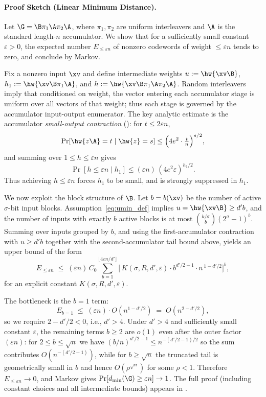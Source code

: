 \paragraph{Proof Sketch (Linear Minimum Distance).}
Let $\G=\B\pi_1\A\pi_2\A$, where $\pi_1,\pi_2$ are uniform interleavers and $\A$
is the standard length-$n$ accumulator. We show that for a sufficiently small
constant $\varepsilon>0$, the expected number $E_{\le \varepsilon n}$ of nonzero
codewords of weight $\le \varepsilon n$ tends to zero, and conclude by Markov.

Fix a nonzero input $\xv$ and define intermediate weights
$u:=\hw{\xv\B}$, $h_1:=\hw{\xv\B\pi_1\A}$, and $h:=\hw{\xv\B\pi_1\A\pi_2\A}$.
Random interleavers imply that conditioned on weight, the vector entering each
accumulator stage is uniform over all vectors of that weight; thus each stage is
governed by the accumulator input-output enumerator.
The key analytic estimate is the accumulator \emph{small-output contraction}
(): for $t\le 2\varepsilon n$,
\[
\Pr[\hw{z\A}=t\mid \hw{z}=s]\le \Big(4e^2\cdot\tfrac{t}{n}\Big)^{s/2},
\]
and summing over $1\le h\le \varepsilon n$ gives
\[
\Pr[h\le \varepsilon n\mid h_1]\le (\varepsilon n)\,(4e^2\varepsilon)^{h_1/2}.
\]
Thus achieving $h\le \varepsilon n$ forces $h_1$ to be small, and is strongly
suppressed in $h_1$.

We now exploit the block structure of $\B$. Let $b=b(\xv)$ be the number of
active $\sigma$-bit input blocks. Assumption~\eqref{eq:umin_def} implies
$u=\hw{\xv\B}\ge d'b$, and the number of inputs with exactly $b$ active blocks is
at most $\binom{k/\sigma}{b}(2^\sigma-1)^b$. Summing over inputs grouped by $b$,
and using the first-accumulator contraction with $u\ge d'b$ together with the
second-accumulator tail bound above, yields an upper bound of the form
\[
E_{\le \varepsilon n}
\;\le\;
(\varepsilon n)\,C_0
\sum_{b=1}^{\lfloor 4\varepsilon n/d'\rfloor}
\Big[\,K(\sigma,R,d',\varepsilon)\cdot b^{d'/2-1}\cdot n^{\,1-d'/2}\Big]^b,
\]
for an explicit constant $K(\sigma,R,d',\varepsilon)$.

The bottleneck is the $b=1$ term:
\[
E_{b=1}\;\le\;(\varepsilon n)\cdot O(n^{1-d'/2}) \;=\; O(n^{2-d'/2}),
\]
so we require $2-d'/2<0$, i.e., $d'>4$. Under $d'>4$ and sufficiently small
constant $\varepsilon$, the remaining terms $b\ge 2$ are $o(1)$ even after the
outer factor $(\varepsilon n)$: for $2\le b\le \sqrt{n}$ we have
$(b/n)^{d'/2-1}\le n^{-(d'/2-1)/2}$ so the sum contributes $O(n^{-(d'/2-1)})$,
while for $b\ge \sqrt{n}$ the truncated tail is geometrically small in $b$ and
hence $O(\rho^{\sqrt{n}})$ for some $\rho<1$. Therefore $E_{\le \varepsilon n}\to 0$,
and Markov gives $\Pr[d_{\min}(\G)\ge \varepsilon n]\to 1$.
The full proof (including constant choices and all intermediate bounds) appears
in .















